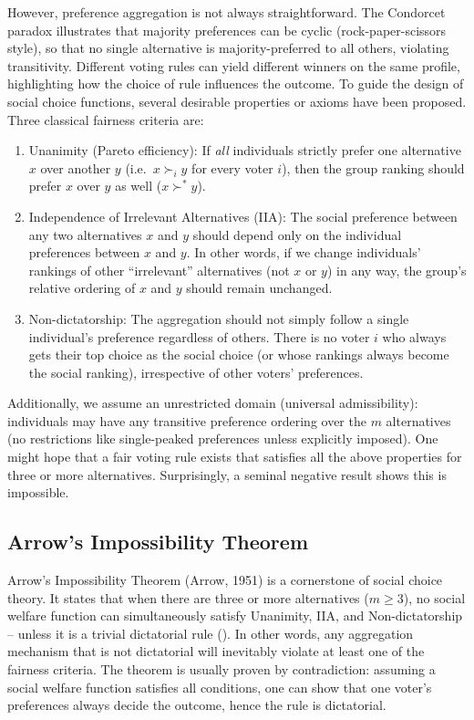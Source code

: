 \documentclass[
  letterpaper,
  numbers=noenddot,
  DIV=11]{scrreprt}
\providecommand{\tightlist}{%
  \setlength{\itemsep}{0pt}\setlength{\parskip}{0pt}}\usepackage{longtable,booktabs,array}
\theoremstyle{definition}
\theoremstyle{plain}
\theoremstyle{plain}
\theoremstyle{remark}
\begin{document}
However, preference aggregation is not always straightforward. The
Condorcet paradox illustrates that majority preferences can be cyclic
(rock-paper-scissors style), so that no single alternative is
majority-preferred to all others, violating transitivity. Different
voting rules can yield different winners on the same profile,
highlighting how the choice of rule influences the outcome. To guide the
design of social choice functions, several desirable properties or
axioms have been proposed. Three classical fairness criteria are:

\begin{enumerate}
\def\labelenumi{\arabic{enumi}.}
\tightlist
\item
  Unanimity (Pareto efficiency): If \emph{all} individuals strictly
  prefer one alternative \(x\) over another \(y\) (i.e.~\(x \succ_i y\)
  for every voter \(i\)), then the group ranking should prefer \(x\)
  over \(y\) as well (\(x \succ^* y\)).
\item
  Independence of Irrelevant Alternatives (IIA): The social preference
  between any two alternatives \(x\) and \(y\) should depend only on the
  individual preferences between \(x\) and \(y\). In other words, if we
  change individuals' rankings of other ``irrelevant'' alternatives (not
  \(x\) or \(y\)) in any way, the group's relative ordering of \(x\) and
  \(y\) should remain unchanged.
\item
  Non-dictatorship: The aggregation should not simply follow a single
  individual's preference regardless of others. There is no voter \(i\)
  who always gets their top choice as the social choice (or whose
  rankings always become the social ranking), irrespective of other
  voters' preferences.
\end{enumerate}

Additionally, we assume an unrestricted domain (universal
admissibility): individuals may have any transitive preference ordering
over the \(m\) alternatives (no restrictions like single-peaked
preferences unless explicitly imposed). One might hope that a fair
voting rule exists that satisfies all the above properties for three or
more alternatives. Surprisingly, a seminal negative result shows this is
impossible.

\subsection{Arrow's Impossibility
Theorem}\label{arrows-impossibility-theorem}

Arrow's Impossibility Theorem (Arrow, 1951) is a cornerstone of social
choice theory. It states that when there are three or more alternatives
(\(m\ge 3\)), no social welfare function can simultaneously satisfy
Unanimity, IIA, and Non-dictatorship -- unless it is a trivial
dictatorial rule (). In
other words, any aggregation mechanism that is not dictatorial will
inevitably violate at least one of the fairness criteria. The theorem is
usually proven by contradiction: assuming a social welfare function
satisfies all conditions, one can show that one voter's preferences
always decide the outcome, hence the rule is dictatorial.
\end{document}
